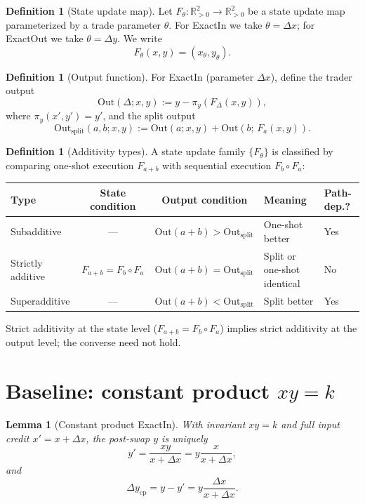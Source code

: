 \documentclass[11pt]{article}
\newtheorem{lemma}[theorem]{Lemma}
\theoremstyle{definition}
\newtheorem{definition}[theorem]{Definition}
\theoremstyle{remark}
\newcommand{\R}{\mathbb{R}}
\newcommand{\Rp}{\R_{>0}}
\newcommand{\dx}{\Delta x}
\newcommand{\dy}{\Delta y}
\newcommand{\projY}{\pi_y}
\begin{document}
\begin{definition}[State update map]
Let $F_\theta:\Rp^2\to\Rp^2$ be a state update map parameterized by a trade parameter $\theta$.
For ExactIn we take $\theta=\dx$; for ExactOut we take $\theta=\dy$.
We write
\[
F_\theta(x,y)=(x_\theta,y_\theta).
\]
\end{definition}

\begin{definition}[Output function]
For ExactIn (parameter $\dx$), define the trader output
\[
\mathrm{Out}(\Delta;x,y) := y-\projY(F_{\Delta}(x,y)),
\]
where $\projY(x',y')=y'$, and the split output
\[
\mathrm{Out}_{\mathrm{split}}(a,b;x,y) := \mathrm{Out}(a;x,y) + \mathrm{Out}(b;\,F_a(x,y)).
\]
\end{definition}

\begin{definition}[Additivity types]\label{def:additivity-types}
A state update family $\{F_\theta\}$ is classified by comparing one-shot execution $F_{a+b}$ with sequential execution $F_b\circ F_a$:
\end{definition}

\begin{center}
\small
\begin{tabular}{@{}lccll@{}}
\toprule
\textbf{Type} & \textbf{State condition} & \textbf{Output condition} & \textbf{Meaning} & \textbf{Path-dep.?} \\
\midrule
Subadditive
  & ---
  & $\mathrm{Out}(a{+}b) > \mathrm{Out}_{\mathrm{split}}$
  & One-shot better
  & Yes \\
\addlinespace
Strictly additive
  & $F_{a+b} = F_b\circ F_a$
  & $\mathrm{Out}(a{+}b) = \mathrm{Out}_{\mathrm{split}}$
  & Split or one-shot identical
  & No \\
\addlinespace
Superadditive
  & ---
  & $\mathrm{Out}(a{+}b) < \mathrm{Out}_{\mathrm{split}}$
  & Split better
  & Yes \\
\bottomrule
\end{tabular}
\end{center}
\noindent
Strict additivity at the state level ($F_{a+b}=F_b\circ F_a$) implies strict additivity at the output level; the converse need not hold.

\section{Baseline: constant product $xy=k$}\label{sec:baseline}

\begin{lemma}[Constant product ExactIn]
With invariant $xy=k$ and full input credit $x'=x+\dx$, the post-swap $y$ is uniquely
\[
 y' = \frac{xy}{x+\dx} = y\frac{x}{x+\dx},
\]
and
\[
\Delta y_{\mathrm{cp}} = y-y' = y\frac{\dx}{x+\dx}.
\]
\end{lemma}
\end{document}
